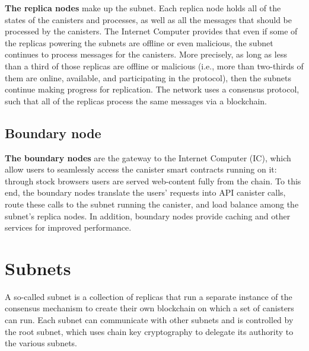   \textbf{The replica nodes} make up the subnet. Each replica node holds all of the states of the canisters and processes, as well as all the messages that should be processed by the canisters. The Internet Computer provides that even if some of the replicas powering the subnets are offline or even malicious, the subnet continues to process messages for the canisters. More precisely, as long as less than a third of those replicas are offline or malicious (i.e., more than two-thirds of them are online, available, and participating in the protocol), then the subnets continue making progress for replication. The network uses a consensus protocol, such that all of the replicas process the same messages via a blockchain.

\subsection{Boundary node}

  \textbf{The boundary nodes} are the gateway to the Internet Computer (IC), which allow users to seamlessly access the canister smart contracts running on it: through stock browsers users are served web-content fully from the chain. To this end, the boundary nodes translate the users' requests into API canister calls, route these calls to the subnet running the canister, and load balance among the subnet's replica nodes. In addition, boundary nodes provide caching and other services for improved performance.



\section{Subnets}

A so-called subnet is a collection of replicas that run a separate instance of the consensus mechanism to create their own blockchain on which a set of canisters can run. Each subnet can communicate with other subnets and is controlled by the root subnet, which uses chain key cryptography to delegate its authority to the various subnets.




